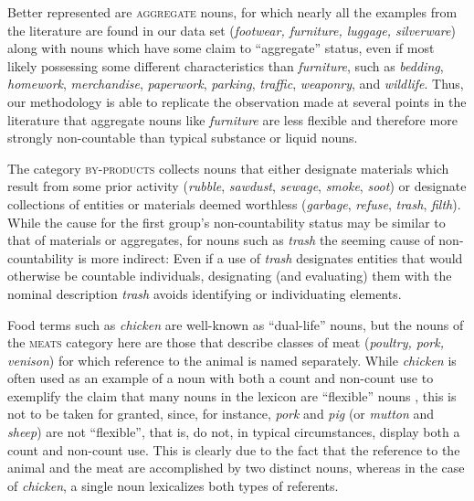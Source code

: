 \documentclass[output=paper]{langscibook}
\begin{document}
Better represented are \textsc{aggregate} nouns, for which nearly all the examples from the literature are found in our data set (\textit{footwear, furniture,  luggage, silverware}) along with nouns which have some claim to ``aggregate'' status, even if most likely possessing some different characteristics than \textit{furniture}, such as  \textit{bedding}, \textit{homework}, \textit{merchandise}, \textit{paperwork}, \textit{parking}, \textit{traffic}, \textit{weaponry},  and \textit{wildlife}.  Thus, our methodology is able to replicate the observation made at several points in the literature that aggregate nouns like \textit{furniture} are less flexible and therefore more strongly non-countable than typical substance or liquid nouns.%








The  category \textsc{by-products} collects nouns that either  designate materials which result from some prior activity  (\textit{rubble}, \textit{sawdust}, \textit{sewage}, \textit{smoke}, \textit{soot}) or designate collections of entities or materials deemed worthless (\textit{garbage}, \textit{refuse},  \textit{trash}, \textit{filth}). While the cause for the first group's non-countability status may be similar to that of materials or aggregates, for nouns such as \textit{trash} the seeming cause of non-countability is more indirect:  Even if a use of \textit{trash} designates entities that would otherwise be countable individuals, designating (and evaluating) them with the nominal description \textit{trash} avoids identifying or individuating elements.


Food terms such as \textit{chicken} are well-known as ``dual-life'' nouns, but the nouns of the  \textsc{meats} category here are those that describe classes of meat (\textit{poultry, pork, venison}) for which reference to the animal is named separately.  While \textit{chicken} is often used as an example of a noun with both a count and non-count use to exemplify the claim that many nouns in the lexicon are ``flexible'' nouns \citep[e.g.][p.~241]{Bale2009}, this is not to be taken for granted, since, for instance, \textit{pork} and \textit{pig} (or \textit{mutton} and \textit{sheep}) are not ``flexible'', that is, do not, in typical circumstances, display both a count and non-count use.  This is clearly due to the fact that the reference to the animal and the meat are accomplished by two distinct nouns, whereas in the case of  \textit{chicken}, a single noun lexicalizes both types of referents.
\end{document}
